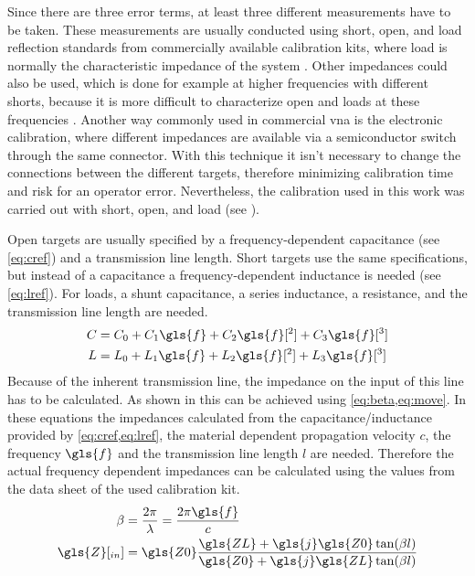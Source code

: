 \documentclass[12pt,a4paper,parskip=full,abstract=true,BCOR=12mm]{scrreprt}
\begin{document}
Since there are three error terms, at least three different measurements have
to be taken. These measurements are usually conducted using short, open, and load reflection standards from commercially available calibration kits,
where load is normally the characteristic impedance of the system \cite{agilent_an_1287-3}.
Other impedances could also be used, which is done for example at higher frequencies
with different shorts, because it is more difficult to characterize open and
loads at these frequencies \cite{anritsu_cal}. Another way commonly used in
commercial \gls{vna} is the electronic calibration, where different impedances
are available via a semiconductor switch through the same connector. With this
technique it isn't necessary to change the connections between the different
targets, therefore minimizing calibration time and risk for an operator error.
Nevertheless, the calibration used in this work was carried out with short, open, and load (see
).

Open targets are usually specified by a frequency-dependent capacitance (see
\cref{eq:cref}) and a transmission line length. Short targets use the same
specifications, but instead of a capacitance a frequency-dependent inductance is
needed (see \cref{eq:lref}). For loads, a shunt capacitance, a series inductance,
a resistance, and the transmission line length are needed.
\begin{align}
    \label{eq:cref} C & = C_0 + C_1 \gls{f} + C_2 \gls{f}[^2] + C_3 \gls{f}[^3] \\
    \label{eq:lref} L & = L_0 + L_1 \gls{f} + L_2 \gls{f}[^2] + L_3 \gls{f}[^3]
\end{align}
Because of the inherent transmission line, the impedance on the input of this
line has to be calculated. As shown in \cite{pozar_mw_engineering_2011} this
can be achieved using \cref{eq:beta,eq:move}. In these equations the impedances
calculated from the capacitance/inductance provided by \cref{eq:cref,eq:lref},
the material dependent propagation velocity $c$, the frequency $\gls{f}$ and the transmission line
length $l$ are needed. Therefore the actual frequency dependent impedances can
be calculated using the values from the data sheet of the used calibration kit.
\begin{align}
    \label{eq:beta} \beta & = \frac{2 \pi}{\lambda} = \frac{2 \pi \gls{f}}{c}\\
    \label{eq:move} \gls{Z}[_{in}] & = \gls{Z0} \frac{\gls{ZL} + \gls{j} \gls{Z0} \tan(\beta l)}{\gls{Z0} + \gls{j} \gls{ZL} \tan(\beta l)}
\end{align}
\end{document}
